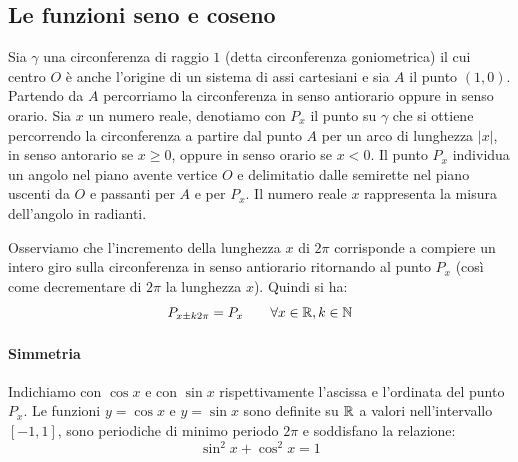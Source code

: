 \subsection{Le funzioni seno e coseno}
Sia $\gamma$ una circonferenza di raggio $1$ (detta circonferenza goniometrica) il cui centro $O$ è anche l'origine di un sistema di assi cartesiani e sia $A$ il punto $(1,0)$.
Partendo da $A$ percorriamo la circonferenza in senso antiorario oppure in senso orario.
Sia $x$ un numero reale, denotiamo con $P_x$ il punto su $\gamma$ che si ottiene percorrendo la circonferenza a partire dal punto $A$ per un arco di lunghezza $|x|$, in senso antorario se $x \geq 0$, oppure in senso orario se $x<0$.
Il punto $P_x$ individua un angolo nel piano avente vertice $O$ e delimitatio dalle semirette nel piano uscenti da $O$ e passanti per $A$ e per $P_x$.
Il numero reale $x$ rappresenta la misura dell'angolo in radianti.


\begin{figure}[bth]
\myfloatalign
{} 
\end{figure}



Osserviamo che l'incremento della lunghezza $x$ di $2\pi$ corrisponde a compiere un intero giro sulla circonferenza in senso antiorario ritornando al punto $P_x$ (così come decrementare di $2\pi$ la lunghezza $x$). Quindi si ha:
\[P_{x\pm k2\pi}=P_x \qquad \forall x \in \mathbb{R}, k \in \mathbb{N}\]

\paragraph{Simmetria}
Indichiamo con $\cos x$ e con $\sin x$ rispettivamente l'ascissa e l'ordinata del punto $P_x$. Le funzioni $y=\cos x$ e $y=\sin x$ sono definite su $\mathbb{R}$ a valori nell'intervallo $[-1,1]$, sono periodiche di minimo periodo $2\pi$ e soddisfano la relazione:
\[\sin^2 x + \cos^2 x = 1\]


